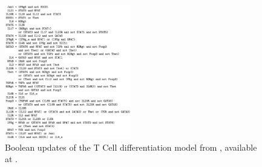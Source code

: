 \begin{figure}[t]
	\begin{center}
		\includegraphics[width=0.49\textwidth]{figs-datamod2023/TcellBN.png}
	\end{center}
	\caption{Boolean updates of the T Cell differentiation model from \cite{puniya2018mechanistic}, available at \cite{ModelCellCollective}.}
	\label{fig:boolean-formulas}
\end{figure}

